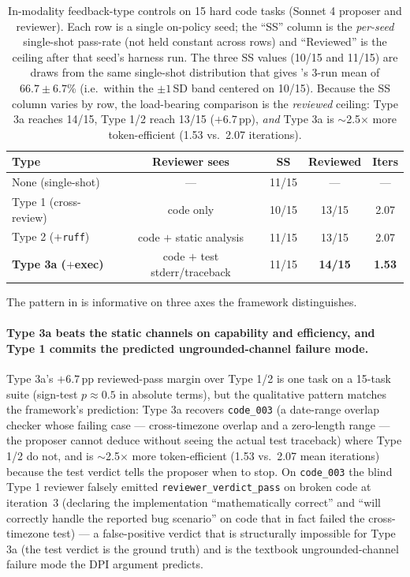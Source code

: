 \documentclass[11pt]{article}
\begin{document}
\begin{table}[ht]
\centering
\caption{In-modality feedback-type controls on 15 hard code tasks (Sonnet 4 proposer and reviewer). Each row is a single on-policy seed; the ``SS'' column is the \emph{per-seed} single-shot pass-rate (not held constant across rows) and ``Reviewed'' is the ceiling after that seed's harness run. The three SS values (10/15 and 11/15) are draws from the same single-shot distribution that gives 's 3-run mean of $66.7 \pm 6.7$\% (i.e.\ within the $\pm 1$\,SD band centered on 10/15). Because the SS column varies by row, the load-bearing comparison is the \emph{reviewed} ceiling: Type 3a reaches 14/15, Type 1/2 reach 13/15 ($+6.7$\,pp), \emph{and} Type 3a is $\sim$2.5$\times$ more token-efficient (1.53 vs.\ 2.07 iterations).}
\label{tab:type-controls}
\small
\begin{tabular}{lcccc}
\toprule
Type & Reviewer sees & SS & Reviewed & Iters \\
\midrule
None (single-shot)             & ---                                  & 11/15 & ---            & --- \\
Type 1 (cross-review)          & code only                            & 10/15 & 13/15          & 2.07 \\
Type 2 ($+$\texttt{ruff})      & code $+$ static analysis             & 11/15 & 13/15          & 2.07 \\
\textbf{Type 3a ($+$exec)}     & code $+$ test stderr/traceback       & 11/15 & \textbf{14/15} & \textbf{1.53} \\
\bottomrule
\end{tabular}
\end{table}

The pattern in  is informative on three axes the framework distinguishes.

\paragraph{Type 3a beats the static channels on capability and efficiency, and Type 1 commits the predicted ungrounded-channel failure mode.} Type 3a's $+6.7$\,pp reviewed-pass margin over Type 1/2 is one task on a 15-task suite (sign-test $p \approx 0.5$ in absolute terms), but the qualitative pattern matches the framework's prediction: Type 3a recovers \texttt{code\_003} (a date-range overlap checker whose failing case --- cross-timezone overlap and a zero-length range --- the proposer cannot deduce without seeing the actual test traceback) where Type 1/2 do not, and is $\sim$2.5$\times$ more token-efficient (1.53 vs.\ 2.07 mean iterations) because the test verdict tells the proposer when to stop. On \texttt{code\_003} the blind Type 1 reviewer falsely emitted \texttt{reviewer\_verdict\_pass} on broken code at iteration~3 (declaring the implementation ``mathematically correct'' and ``will correctly handle the reported bug scenario'' on code that in fact failed the cross-timezone test) --- a false-positive verdict that is structurally impossible for Type 3a (the test verdict is the ground truth) and is the textbook ungrounded-channel failure mode the DPI argument predicts.
\end{document}
